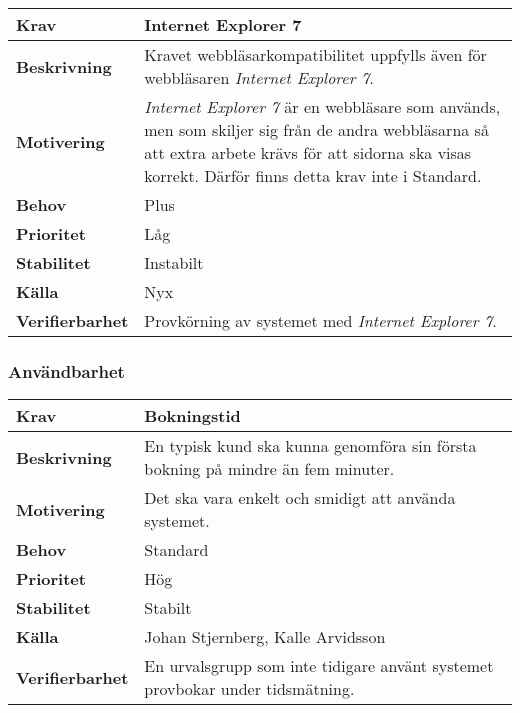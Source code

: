 \documentclass[a4paper, twoside, 11pt, titlepage]{article}
\begin{document}
		\begin{tabular} { p{2.6cm} p{12.5cm} }
			\hline
			\sffamily\textbf{Krav} & Internet Explorer 7  \\
			\hline
			\sffamily\textbf{Beskrivning} & Kravet webbläsarkompatibilitet uppfylls även för webbläsaren \emph{Internet Explorer 7}.  \\
			\hline
			\sffamily\textbf{Motivering} &  \emph{Internet Explorer 7} är en webbläsare som används, men som skiljer sig från de andra webbläsarna så att extra arbete krävs för att sidorna ska visas korrekt. Därför finns detta krav inte i Standard.  \\
			\hline
			\sffamily\textbf{Behov} & Plus  \\
			\hline
			\sffamily\textbf{Prioritet} & Låg  \\
			\hline
			\sffamily\textbf{Stabilitet} & Instabilt  \\
			\hline
			\sffamily\textbf{Källa} & Nyx  \\
			\hline
			\sffamily\textbf{Verifierbarhet} & Provkörning av systemet med \emph{Internet Explorer 7}.  \\
			\hline
		\end{tabular}


		\subsubsection{Användbarhet}


		\begin{tabular} { p{2.6cm} p{12.5cm} }
			\hline
			\sffamily\textbf{Krav} & Bokningstid  \\
			\hline
			\sffamily\textbf{Beskrivning} & En typisk kund ska kunna genomföra sin första bokning på mindre än fem minuter.  \\
			\hline
			\sffamily\textbf{Motivering} & Det ska vara enkelt och smidigt att använda systemet.  \\
			\hline
			\sffamily\textbf{Behov} & Standard  \\
			\hline
			\sffamily\textbf{Prioritet} & Hög  \\
			\hline
			\sffamily\textbf{Stabilitet} & Stabilt  \\
			\hline
			\sffamily\textbf{Källa} & Johan Stjernberg, Kalle Arvidsson  \\
			\hline
			\sffamily\textbf{Verifierbarhet} & En urvalsgrupp som inte tidigare använt systemet provbokar under tidsmätning.  \\
			\hline
		\end{tabular}
		\vspace{6mm}
\end{document}
